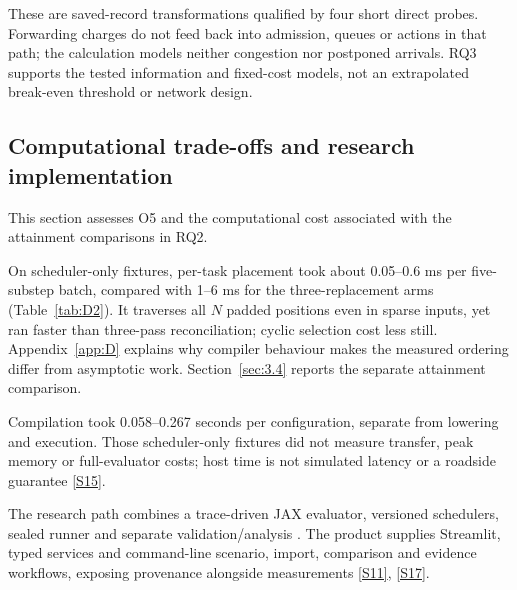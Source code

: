\documentclass[12pt,a4paper]{article}
\begin{document}
These are saved-record transformations qualified by four short direct probes. Forwarding charges do not feed back into admission, queues or actions in that path; the calculation models neither congestion nor postponed arrivals. RQ3 supports the tested information and fixed-cost models, not an extrapolated break-even threshold or network design.

\FloatBarrier
\subsection{Computational trade-offs and research implementation}\label{sec:3.7}

This section assesses O5 and the computational cost associated with the attainment comparisons in RQ2.

On scheduler-only fixtures, per-task placement took about 0.05--0.6 ms per five-substep batch, compared with 1--6 ms for the three-replacement arms (Table~\ref{tab:D2}). It traverses all $N$ padded positions even in sparse inputs, yet ran faster than three-pass reconciliation; cyclic selection cost less still. Appendix~\ref{app:D} explains why compiler behaviour makes the measured ordering differ from asymptotic work. Section~\ref{sec:3.4} reports the separate attainment comparison.





Compilation took 0.058--0.267 seconds per configuration, separate from lowering and execution. Those scheduler-only fixtures did not measure transfer, peak memory or full-evaluator costs; host time is not simulated latency or a roadside guarantee \hyperref[source-s15]{[S15]}.

The research path combines a trace-driven JAX evaluator, versioned schedulers, sealed runner and separate validation/analysis \cite{ref36}. The product supplies Streamlit, typed services and command-line scenario, import, comparison and evidence workflows, exposing provenance alongside measurements \hyperref[source-s11]{[S11]}, \hyperref[source-s17]{[S17]}.
\end{document}
